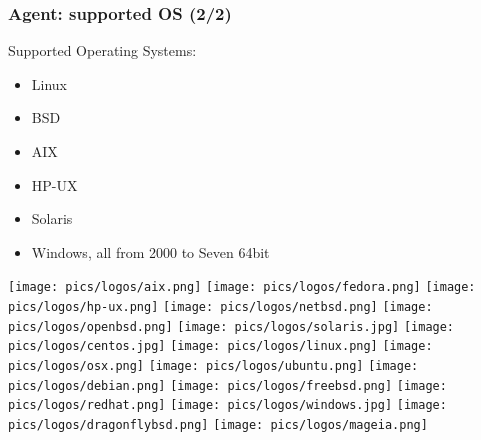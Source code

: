 \documentclass{beamer}
\begin{document}
\begin{frame}
    \frametitle{Agent: supported OS (2/2)}
    Supported Operating Systems:

    \begin{itemize}
        \item<2-> Linux
        \item<3-> BSD
        \item<4-> AIX
        \item<5-> HP-UX
        \item<6-> Solaris
        \item<7-> Windows, all from 2000 to Seven 64bit
    \end{itemize}



\texttt{[image: pics/logos/aix.png]}
\texttt{[image: pics/logos/fedora.png]}
\texttt{[image: pics/logos/hp-ux.png]}
\texttt{[image: pics/logos/netbsd.png]}
\texttt{[image: pics/logos/openbsd.png]}
\texttt{[image: pics/logos/solaris.jpg]}
\texttt{[image: pics/logos/centos.jpg]}
\texttt{[image: pics/logos/linux.png]}
\texttt{[image: pics/logos/osx.png]}
\texttt{[image: pics/logos/ubuntu.png]}
\texttt{[image: pics/logos/debian.png]}
\texttt{[image: pics/logos/freebsd.png]}
\texttt{[image: pics/logos/redhat.png]}
\texttt{[image: pics/logos/windows.jpg]}
\texttt{[image: pics/logos/dragonflybsd.png]}
\texttt{[image: pics/logos/mageia.png]}

\end{frame}
\end{document}
